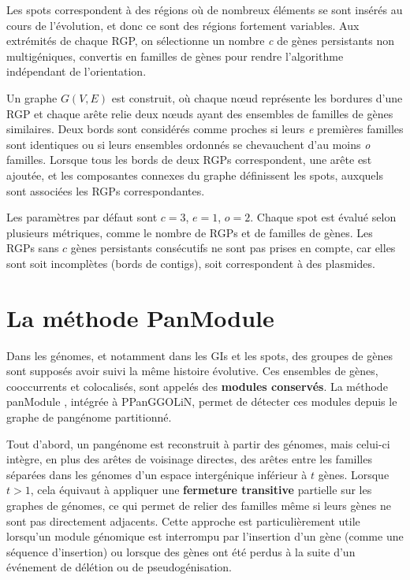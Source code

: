 Les spots correspondent à des régions où de nombreux éléments se sont insérés au cours de l'évolution, et donc ce sont des régions fortement variables. Aux extrémités de chaque RGP, on sélectionne un nombre \textit{c} de gènes persistants non multigéniques, convertis en familles de gènes pour rendre l’algorithme indépendant de l’orientation.

\newpage

Un graphe $G(V, E)$ est construit, où chaque n\oe ud représente les bordures d’une RGP et chaque arête relie deux n\oe uds ayant des ensembles de familles de gènes similaires. Deux bords sont considérés comme proches si leurs \textit{e} premières familles sont identiques ou si leurs ensembles ordonnés se chevauchent d’au moins \textit{o} familles. Lorsque tous les bords de deux RGPs correspondent, une arête est ajoutée, et les composantes connexes du graphe définissent les spots, auxquels sont associées les RGPs correspondantes.

Les paramètres par défaut sont $c=3$, $e=1$, $o=2$. Chaque spot est évalué selon plusieurs métriques, comme le nombre de RGPs et de familles de gènes. Les RGPs sans $c$ gènes persistants consécutifs ne sont pas prises en compte, car elles sont soit incomplètes (bords de contigs), soit correspondent à des plasmides.

\section{La méthode PanModule}

Dans les génomes, et notamment dans les GIs et les spots, des groupes de gènes sont supposés avoir suivi la même histoire évolutive. Ces ensembles de gènes, cooccurrents et colocalisés, sont appelés des \textbf{modules conservés}. La méthode panModule \cite{bazin_panmodule_2021}, intégrée à PPanGGOLiN, permet de détecter ces modules depuis le graphe de pangénome partitionné. 

\newpage

Tout d'abord, un pangénome est reconstruit à partir des génomes, mais celui-ci intègre, en plus des arêtes de voisinage directes, des arêtes entre les familles séparées dans les génomes d'un espace intergénique inférieur à $t$ gènes. Lorsque $t > 1$, cela équivaut à appliquer une \textbf{fermeture transitive} partielle sur les graphes de génomes, ce qui permet de relier des familles même si leurs gènes ne sont pas directement adjacents. Cette approche est particulièrement utile lorsqu’un module génomique est interrompu par l’insertion d’un gène (comme une séquence d’insertion) ou lorsque des gènes ont été perdus à la suite d’un événement de délétion ou de pseudogénisation.

